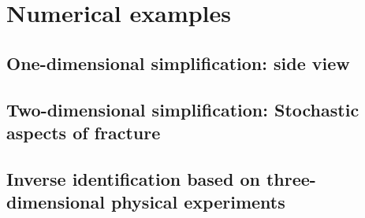 \section{Numerical examples}
\label{section: cohesive/examples}

\subsection{One-dimensional simplification: side view}

\subsection{Two-dimensional simplification: Stochastic aspects of fracture}

\subsection{Inverse identification based on three-dimensional physical experiments}
